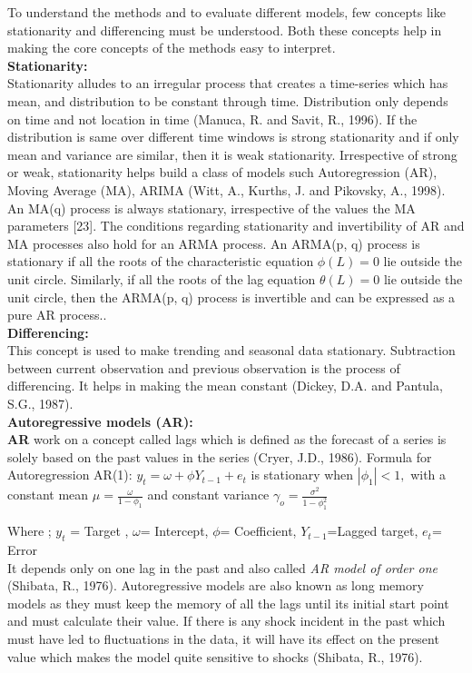 \documentclass[10pt]{report}
\begin{document}
\begin{flushleft}
		To understand the methods and to evaluate different models, few concepts like stationarity and differencing must be understood. Both these concepts help in making the core concepts of the methods easy to interpret. \\
		\textbf{Stationarity:}\\
		Stationarity alludes to an irregular process that creates a time-series which has mean, and distribution to be constant through time. Distribution only depends on time and not location in time (Manuca, R. and Savit, R., 1996). If the distribution is same over different time windows is strong stationarity and if only mean and variance are similar, then it is weak stationarity. Irrespective of strong or weak, stationarity helps build a class of models such Autoregression (AR), Moving Average (MA), ARIMA (Witt, A., Kurths, J. and Pikovsky, A., 1998). \\
		
		An MA(q) process is always stationary, irrespective of the values the MA parameters [23]. The conditions regarding stationarity and invertibility of AR and MA processes also hold for an ARMA process. An ARMA(p, q) process is stationary if all the roots of the characteristic equation $ \phi(L) = 0 $ lie outside the unit circle. Similarly, if all the roots of the lag equation 
		$ \theta (L) = 0 $ lie outside the unit circle, then the ARMA(p, q) process is invertible and can be expressed as a pure AR process..\\
		\textbf{Differencing:}\\
		This concept is used to make trending and seasonal data stationary. Subtraction between current observation and previous observation is the process of differencing. It helps in making the mean constant (Dickey, D.A. and Pantula, S.G., 1987). \\
		\textbf{Autoregressive models (AR):}\\
		\textbf{AR} work on a concept called lags which is defined as the forecast of a series is solely based on the past values in the series (Cryer, J.D., 1986). Formula for Autoregression AR(1):  $\displaystyle y_{t} = \omega + \phi Y _{t-1}+ e_{t}$ is stationary when $ |\phi_{1}| < 1,  $ with a constant mean $\displaystyle \mu = \frac{\omega}{1-\phi_{1}} $ and constant variance $ \displaystyle \gamma_{o} = \frac{\sigma^{2}}{1-\phi_{1}^{2}} $
		 
		Where ; \quad	
		$ y_{t}$  = Target ,\quad
		$\omega$= Intercept,\quad
		$\phi$= Coefficient,\quad
		$Y _{t-1}$=Lagged target,\quad
		$e_{t}$= Error\\
		It depends only on one lag in the past and also called  \emph{AR model of order one} (Shibata, R., 1976). Autoregressive models are also known as long memory models as they must keep the memory of all the lags until its initial start point and must calculate their value. If there is any shock incident in the past which must have led to fluctuations in the data, it will have its effect on the present value which makes the model quite sensitive to shocks (Shibata, R., 1976). \\
		

\end{flushleft}
\end{document}
